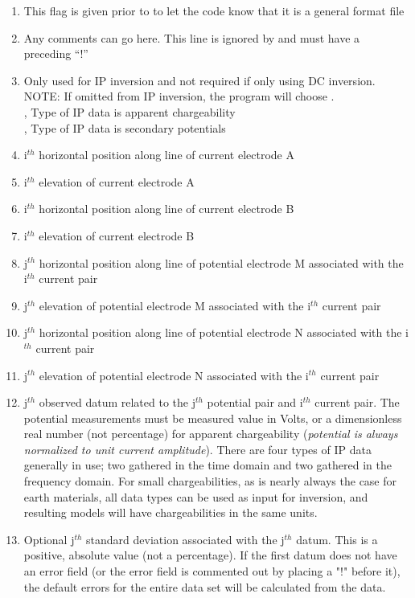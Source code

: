 \begin{enumerate}
\item[\codeName{COMMON\_CURRENT}] This flag is given prior to  to let the code know that it is a general format file
\item[\codeName{! Comment Line}] Any comments can go here. This line is ignored by  and must have a preceding ``!''
\item[\codeName{IPTYPE}] Only used for IP inversion and not required if only using DC inversion. NOTE: If omitted from IP inversion, the program will choose . \\
     , Type of IP data is apparent chargeability \\
		 , Type of IP data is secondary potentials
%
\item[\codeName{A$_i^x$}] i$^{th}$ horizontal position along line of current electrode A
\item[\codeName{A$_i^z$}] i$^{th}$ elevation of current electrode A
\item[\codeName{B$_i^x$}] i$^{th}$ horizontal position along line of current electrode B
\item[\codeName{B$_i^z$}] i$^{th}$ elevation of current electrode B
\item[\codeName{M$_j^x$}] j$^{th}$ horizontal position along line of potential electrode M associated with the i$^{th}$ current pair
\item[\codeName{M$_j^z$}] j$^{th}$ elevation of potential electrode M associated with the i$^{th}$ current pair
\item[\codeName{N$_j^x$}] j$^{th}$ horizontal position along line of potential electrode N associated with the i$^{th}$ current pair
\item[\codeName{N$_j^z$}] j$^{th}$ elevation of potential electrode N associated with the i$^{th}$ current pair
\item[\codeName{val$_j$}] j$^{th}$ observed datum related to the j$^{th}$ potential pair and i$^{th}$ current pair. The potential measurements must be measured value in Volts, or a dimensionless real number (not percentage) for apparent chargeability (\textit{potential is always normalized to unit current amplitude}). There are four types of IP data generally in use; two gathered in the time domain and two gathered in the frequency domain. For small chargeabilities, as is nearly always the case for earth materials, all data types can be used as input for inversion, and resulting models will have chargeabilities in the same units.
\item[\codeName{stn$_j$}] Optional j$^{th}$ standard deviation associated with the j$^{th}$ datum. This is a positive, absolute value (not a percentage). If the first datum does not have an error field (or the error field is commented out by placing a "!" before it), the default errors for the entire data set will be calculated from the data.
\end{enumerate}

